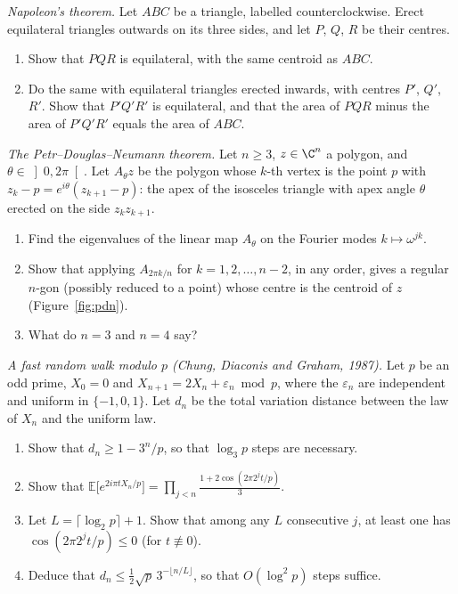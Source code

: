 \begin{exercise}[$\star\star$]\label{pb:napoleon}
\emph{Napoleon's theorem.} Let $ABC$ be a triangle, labelled counterclockwise. Erect equilateral triangles outwards on its
three sides, and let $P$, $Q$, $R$ be their centres.
\begin{enumerate}[label=(\alph*)]
\item Show that $PQR$ is equilateral, with the same centroid as $ABC$.
\item Do the same with equilateral triangles erected inwards, with centres $P'$, $Q'$, $R'$. Show that $P'Q'R'$ is
equilateral, and that the area of $PQR$ minus the area of $P'Q'R'$ equals the area of $ABC$.
\end{enumerate}
\end{exercise}

\begin{exercise}[$\star\star\star$]\label{pb:pdn}
\emph{The Petr--Douglas--Neumann theorem.} Let $n\ge3$, $z\in\C^n$ a polygon, and $\theta\in\left]0,2\pi\right[$. Let
$A_\theta z$ be the polygon whose $k$-th vertex is the point $p$ with $z_k-p=e^{i\theta}(z_{k+1}-p)$: the apex of the
isosceles triangle with apex angle $\theta$ erected on the side $z_kz_{k+1}$.
\begin{enumerate}[label=(\alph*)]
\item Find the eigenvalues of the linear map $A_\theta$ on the Fourier modes $k\mapsto\omega^{jk}$.
\item Show that applying $A_{2\pi k/n}$ for $k=1,2,\dots,n-2$, in any order, gives a regular $n$-gon (possibly reduced to a
point) whose centre is the centroid of $z$ (Figure~\ref{fig:pdn}).
\item What do $n=3$ and $n=4$ say?
\end{enumerate}
\end{exercise}

\begin{exercise}[$\star\star\star$]\label{pb:cdg}
\emph{A fast random walk modulo $p$ (Chung, Diaconis and Graham, 1987).} Let $p$ be an odd prime, $X_0=0$ and
$X_{n+1}=2X_n+\varepsilon_n\bmod p$, where the $\varepsilon_n$ are independent and uniform in $\{-1,0,1\}$. Let $d_n$ be the total
variation distance between the law of $X_n$ and the uniform law.
\begin{enumerate}[label=(\alph*)]
\item Show that $d_n\ge1-3^n/p$, so that $\log_3p$ steps are necessary.
\item Show that $\mathbb E\bigl[e^{2i\pi tX_n/p}\bigr]=\prod_{j<n}\frac{1+2\cos(2\pi2^jt/p)}3$.
\item Let $L=\lceil\log_2p\rceil+1$. Show that among any $L$ consecutive $j$, at least one has $\cos(2\pi2^jt/p)\le0$ (for
$t\not\equiv0$).
\item Deduce that $d_n\le\frac12\sqrt p\,3^{-\lfloor n/L\rfloor}$, so that $O(\log^2p)$ steps suffice.
\end{enumerate}
\end{exercise}

